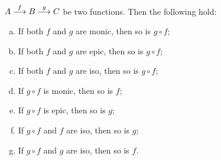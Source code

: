 \begin{lemma}\label{lem:mono epi iso properties}
	$A\stackrel{f}{\longrightarrow}B\stackrel{g}{\longrightarrow}C$ be two functions. Then the following hold:
		\begin{enumerate}[(a)]
			\item If both $f$ and $g$ are monic, then so is $g\circ f$;
			\item If both $f$ and $g$ are epic, then so is $g\circ f$;
			\item If both $f$ and $g$ are iso, then so is $g\circ f$;
			\item If $g\circ f$ is monic, then so is $f$;
			\item If $g\circ f$ is epic, then so is $g$;
			\item If $g\circ f$ and $f$ are iso, then so is $g$;
			\item If $g\circ f$ and $g$ are iso, then so is $f$.
		\end{enumerate}
\end{lemma}
